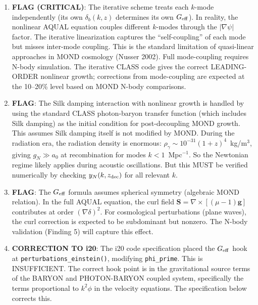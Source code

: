 \documentclass[11pt]{article}
\theoremstyle{definition}
\theoremstyle{remark}
\newcommand{\Geff}{G_{\rm eff}}
\begin{document}
\begin{tcolorbox}[colback=red!5!white, colframe=red!60!black,
  title=\textbf{INCONSISTENCIES AND FLAGS}]
\begin{enumerate}[nosep]
\item \textbf{FLAG (CRITICAL)}: The iterative scheme treats each $k$-mode
  independently (its own $\delta_b(k,z)$ determines its own $\Geff$).
  In reality, the nonlinear AQUAL equation couples different $k$-modes
  through the $|\nabla\psi|$ factor. The iterative linearization captures
  the ``self-coupling'' of each mode but misses inter-mode coupling.
  This is the standard limitation of quasi-linear approaches in MOND
  cosmology (Nusser 2002). Full mode-coupling requires N-body simulation.
  The iterative CLASS code gives the correct LEADING-ORDER nonlinear
  growth; corrections from mode-coupling are expected at the 10--20\%
  level based on MOND N-body comparisons.

\item \textbf{FLAG}: The Silk damping interaction with nonlinear growth
  is handled by using the standard CLASS photon-baryon transfer function
  (which includes Silk damping) as the initial condition for post-decoupling
  MOND growth. This assumes Silk damping itself is not modified by MOND.
  During the radiation era, the radiation density is enormous:
  $\rho_\gamma \sim 10^{-31}(1+z)^4$~kg/m$^3$, giving $g_N \gg a_0$
  at recombination for modes $k < 1$~Mpc$^{-1}$. So the Newtonian regime
  likely applies during acoustic oscillations. But this MUST be verified
  numerically by checking $y_N(k, z_{\rm dec})$ for all relevant $k$.

\item \textbf{FLAG}: The $\Geff$ formula assumes spherical symmetry
  (algebraic MOND relation). In the full AQUAL equation, the curl field
  $\mathbf{S} = \nabla \times [(\mu - 1)\mathbf{g}]$ contributes at
  order $(\nabla\delta)^2$. For cosmological perturbations (plane waves),
  the curl correction is expected to be subdominant but nonzero.
  The N-body validation (Finding 5) will capture this effect.

\item \textbf{CORRECTION TO i20}: The i20 code specification placed the
  $\Geff$ hook at \texttt{perturbations\_einstein()}, modifying
  \texttt{phi\_prime}. This is INSUFFICIENT. The correct hook point is
  in the gravitational source terms of the BARYON and PHOTON-BARYON
  coupled system, specifically the terms proportional to $k^2\phi$ in
  the velocity equations. The specification below corrects this.
\end{enumerate}
\end{tcolorbox}
\end{document}
